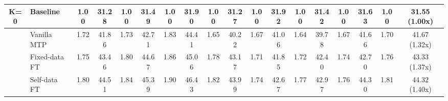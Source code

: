 \documentclass{article} %
\begin{document}
\begin{table}[ht]
\begin{adjustbox}{width=\textwidth}
\begin{tabular}{clcccccccccccccccc}
K=0                               & Baseline                                      & 1.00                         & 31.28                                  & 1.00                         & 31.49                                  & 1.00                         & 31.90                                  & 1.00                         & 31.27                                  & 1.00                         & 31.92                                  & 1.00                         & 31.42                                  & 1.00                         & 31.63                                  & 1.00                         & 31.55 (1.00x)                                  \\ \midrule
                                  & Vanilla MTP                                   & 1.72                         & 41.86                                  & 1.73                         & 42.71                                  & 1.83                         & 44.41                                  & 1.65                         & 40.22                                  & 1.67                         & 41.06                                  & 1.64                         & 39.78                                  & 1.67                         & 41.66                                  & 1.70                         & 41.67 (1.32x)                                  \\
                                  & Fixed-data FT                             & 1.75                         & 43.46                                  & 1.80                         & 44.67                                  & 1.86                         & 45.06                                  & 1.78                         & 43.17                                  & 1.71                         & 41.85                                  & 1.72                         & 42.40                                  & 1.74                         & 42.70                                  & 1.76                         & 43.33 (1.37x)                                  \\
                                  & Self-data FT                             & 1.80                         & 44.51                                  & 1.84                         & 45.39                                  & 1.90                         & 46.43                                  & 1.82                         & 43.99                                  & 1.74                         & 42.67                                  & 1.77                         & 42.97                                  & 1.76                         & 44.30                                  & 1.81                         & 44.32 (1.40x)                                  \\

\end{tabular}
\end{adjustbox}
\end{table}
\end{document}
